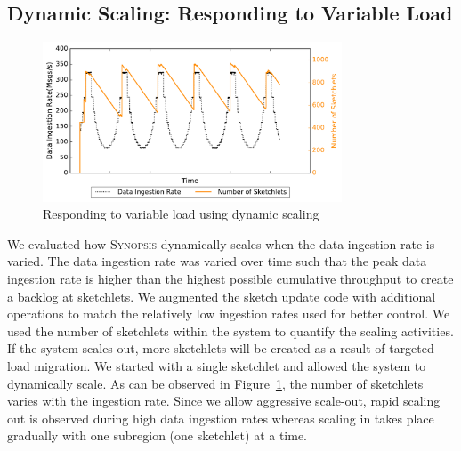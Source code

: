 \subsection{Dynamic Scaling: Responding to Variable Load}
%
\begin{figure}[t!]
    \centerline{\includegraphics[width=3.5in]{figures/dyn-scaling.pdf}}
    \caption{Responding to variable load using dynamic scaling}
    \label{fig:dyn-scaling}
\end{figure}
%
We evaluated how \textsc{Synopsis} dynamically scales when the data ingestion rate is varied.
The data ingestion rate was varied over time such that the peak data ingestion rate is higher than the highest possible cumulative throughput to create a backlog at sketchlets.
We augmented the sketch update code with additional operations to match the relatively low ingestion rates used for better control.
We used the number of sketchlets within the system to quantify the scaling activities.
If the system scales out, more sketchlets will be created as a result of targeted load migration.
We started with a single sketchlet and allowed the system to dynamically scale.
As can be observed in Figure~\ref{fig:dyn-scaling}, the number of sketchlets varies with the ingestion rate.
Since we allow aggressive scale-out, rapid scaling out is observed during high data ingestion rates whereas scaling in takes place gradually with one subregion (one sketchlet) at a time.

